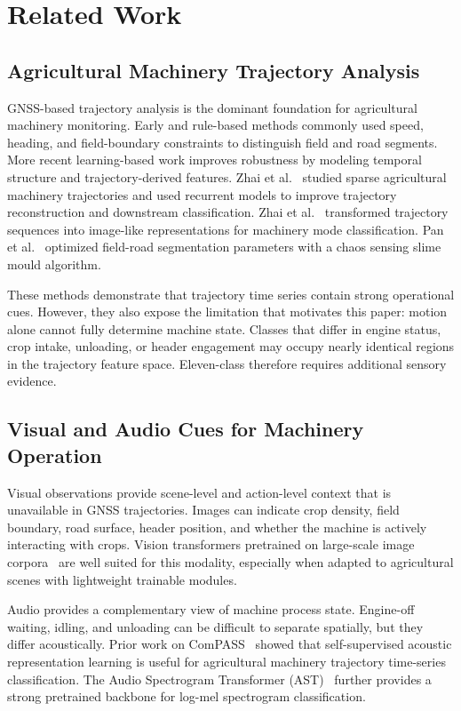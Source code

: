 \section{Related Work}
\label{sec:related}

\subsection{Agricultural Machinery Trajectory Analysis}

GNSS-based trajectory analysis is the dominant foundation for agricultural machinery monitoring. Early and rule-based methods commonly used speed, heading, and field-boundary constraints to distinguish field and road segments. More recent learning-based work improves robustness by modeling temporal structure and trajectory-derived features. Zhai et al.~\cite{zhai2024bilstm} studied sparse agricultural machinery trajectories and used recurrent models to improve trajectory reconstruction and downstream classification. Zhai et al.~\cite{zhai2024atrnet} transformed trajectory sequences into image-like representations for machinery mode classification. Pan et al.~\cite{pan2024chaos} optimized field-road segmentation parameters with a chaos sensing slime mould algorithm.

These methods demonstrate that trajectory time series contain strong operational cues. However, they also expose the limitation that motivates this paper: motion alone cannot fully determine machine state. Classes that differ in engine status, crop intake, unloading, or header engagement may occupy nearly identical regions in the trajectory feature space. Eleven-class \task{} therefore requires additional sensory evidence.

\subsection{Visual and Audio Cues for Machinery Operation}

Visual observations provide scene-level and action-level context that is unavailable in GNSS trajectories. Images can indicate crop density, field boundary, road surface, header position, and whether the machine is actively interacting with crops. Vision transformers pretrained on large-scale image corpora~\cite{dosovitskiy2021vit} are well suited for this modality, especially when adapted to agricultural scenes with lightweight trainable modules.

Audio provides a complementary view of machine process state. Engine-off waiting, idling, and unloading can be difficult to separate spatially, but they differ acoustically. Prior work on ComPASS~\cite{guo2025compass} showed that self-supervised acoustic representation learning is useful for agricultural machinery trajectory time-series classification. The Audio Spectrogram Transformer (AST)~\cite{gong2021ast} further provides a strong pretrained backbone for log-mel spectrogram classification.

